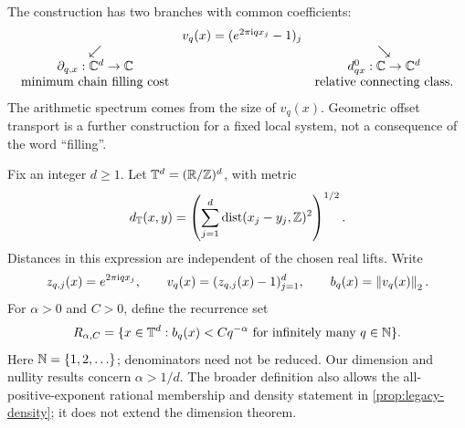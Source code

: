 \documentclass[11pt,a4paper]{article}
\begin{document}
The construction has two branches with common coefficients:
\[
\begin{array}{ccc}
 & v_q(x)=(e^{2\pi\mathrm i qx_j}-1)_j & \\
 \swarrow & & \searrow \\
 \partial_{q,x}:\mathbb C^d\to\mathbb C && d^0_{qx}:\mathbb C\to\mathbb C^d \\
 \text{minimum chain filling cost} && \text{relative connecting class}.
\end{array}
\]
The arithmetic spectrum comes from the size of $v_q(x)$.  Geometric offset
transport is a further construction for a fixed local system, not a
consequence of the word ``filling''.

Fix an integer $d\geq1$.  Let $\mathbb T^d=(\mathbb R/\mathbb Z)^d$, with metric
\[
 d_{\mathbb T}(x,y)=\left(\sum_{j=1}^d
                  \operatorname{dist}(x_j-y_j,\mathbb Z)^2\right)^{1/2}.
\]
Distances in this expression are independent of the chosen real lifts.
Write
\begin{equation}\label{eq:basic-data}
 z_{q,j}(x)=e^{2\pi\mathrm i qx_j},\qquad
 v_q(x)=(z_{q,j}(x)-1)_{j=1}^d,\qquad
 b_q(x)=\left\lVert v_q(x)\right\rVert_2.
\end{equation}
For $\alpha>0$ and $C>0$, define the recurrence set
\begin{equation}\label{eq:recurrence-locus}
 R_{\alpha,C}
 =\{x\in\mathbb T^d:b_q(x)<Cq^{-\alpha}
                       \text{ for infinitely many }q\in\mathbb N\}.
\end{equation}
Here $\mathbb N=\{1,2,\ldots\}$; denominators need not be reduced.  Our dimension
and nullity results concern $\alpha>1/d$.  The broader definition also
allows the all-positive-exponent rational membership and density statement
in \cref{prop:legacy-density}; it does not extend the dimension theorem.
\end{document}
